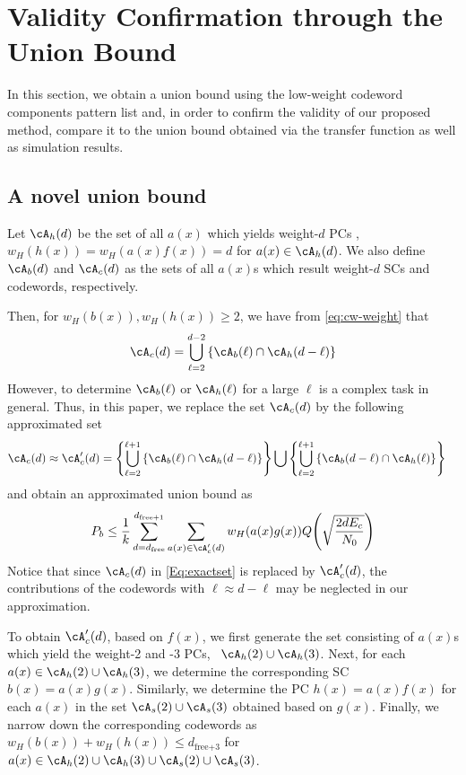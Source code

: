\section{Validity Confirmation through the Union Bound}
\label{sec4}
 In this section, we obtain a union bound using the low-weight codeword components pattern list and,  in order to confirm the validity of our proposed method, compare it to the union bound obtained via the transfer function as well as simulation results.

\subsection{A novel union bound}
Let $\cA_h(d)$ be the set of all $a(x)$ which yields weight-$d$ PCs \ie, $w_H(h(x))=w_H(a(x)f(x))=d$ for $a(x) \in \cA_h(d)$. We also define $\cA_b(d)$ and $\cA_c(d)$ as the sets of all $a(x)$s which result weight-$d$ SCs and codewords, respectively.

Then, for $w_H(b(x)), w_H(h(x)) \geq 2$, we have from \eqref{eq:cw-weight} that
\begin{align}
\cA_c(d) = \bigcup_{\ell = 2}^{d-2} \left\{\cA_b(\ell) \cap \cA_h(d-\ell)\right\}
\label{Eq:exactset}
\end{align}
However, to determine $\cA_b(\ell)$ or $\cA_h(\ell)$ for a large $\ell$ is a complex task in general. Thus, in this paper, we replace the set $\cA_c(d)$ by the following approximated set %
\begin{equation}
\begin{split}
\cA_c(d) \approx \cA_c'(d) &= \left\{\bigcup_{\ell = 2}^{\ell+1} \left\{\cA_b(\ell) \cap \cA_h(d-\ell)\right\}\right\}\bigcup \left\{\bigcup_{\ell = 2}^{\ell+1} \left\{\cA_b(d-\ell) \cap \cA_h(\ell)\right\}\right\}
\end{split}
\label{setApprox}
\end{equation}
and obtain an approximated union bound as
\begin{align}
P_b \leq \frac{1}{k} \sum_{d=d_{\text{free}}}^{d_{\text{free}+1}} \sum_{a(x) \in \cA'_c(d)}w_H(a(x)g(x)) Q\Bigg( \sqrt{\frac{2dE_c}{N_0}}\Bigg)
\label{novelEq7}
\end{align}
Notice that since $\cA_c(d)$ in \eqref{Eq:exactset} is replaced by $\cA_c'(d)$, the contributions of the codewords with $\ell \approx d-\ell$ may be neglected in our approximation.

To obtain $\cA_c'(d)$, based on $f(x)$, we first generate the set consisting of $a(x)$s which yield the weight-2 and -3 PCs, \ie~$\cA_h(2)\cup\cA_h(3)$. Next, for each $a(x) \in \cA_h(2)\cup\cA_h(3)$, we determine the corresponding SC $b(x)=a(x)g(x)$. Similarly, we determine the PC $h(x)=a(x)f(x)$ for each $a(x)$ in the set $\cA_s(2)\cup\cA_s(3)$  obtained based on $g(x)$. Finally, we narrow down the corresponding codewords as $w_H(b(x))+w_H(h(x)) \leq d_{\text{free+3}}$ for $a(x) \in \cA_h(2)\cup\cA_h(3)\cup\cA_s(2)\cup\cA_s(3)$.

